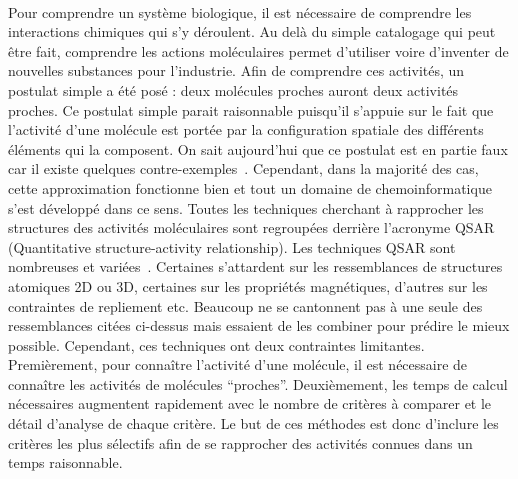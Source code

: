 \documentclass[12pt,french,twoside]{report}
\begin{document}
\paragraph{}Pour comprendre un système biologique, il est nécessaire de comprendre les interactions chimiques qui s'y déroulent.
Au delà du simple catalogage qui peut être fait, comprendre les actions moléculaires permet d'utiliser voire d'inventer de nouvelles substances pour l'industrie.
Afin de comprendre ces activités, un postulat simple a été posé : deux molécules proches auront deux activités proches.
Ce postulat simple parait raisonnable puisqu'il s'appuie sur le fait que l'activité d'une molécule est portée par la configuration spatiale des différents éléments qui la composent.
On sait aujourd'hui que ce postulat est en partie faux car il existe quelques contre-exemples~\cite{patani_bioisosterism:_1996}.
Cependant, dans la majorité des cas, cette approximation fonctionne bien et tout un domaine de chemoinformatique s'est développé dans ce sens.
Toutes les techniques cherchant à rapprocher les structures des activités moléculaires sont regroupées derrière l'acronyme QSAR (Quantitative structure-activity relationship).
Les techniques QSAR sont nombreuses et variées~\cite{patani_bioisosterism:_1996,leach_molecular_2001,helma_predictive_2005}.
Certaines s'attardent sur les ressemblances de structures atomiques 2D ou 3D, certaines sur les propriétés magnétiques, d'autres sur les contraintes de repliement etc.
Beaucoup ne se cantonnent pas à une seule des ressemblances citées ci-dessus mais essaient de les combiner pour prédire le mieux possible.
Cependant, ces techniques ont deux contraintes limitantes.
Premièrement, pour connaître l'activité d'une molécule, il est nécessaire de connaître les activités de molécules ``proches''.
Deuxièmement, les temps de calcul nécessaires augmentent rapidement avec le nombre de critères à comparer et le détail d'analyse de chaque critère.
Le but de ces méthodes est donc d'inclure les critères les plus sélectifs afin de se rapprocher des activités connues dans un temps raisonnable.
\end{document}
